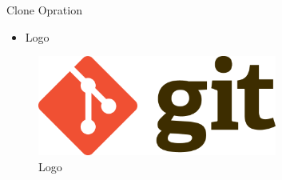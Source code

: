 
\sloppy
{\fontsize{18pt}{18pt}\selectfont Clone Opration \\} \par
\begin{itemize}
	\item Logo
\end{itemize}
\begin{figure}[ht]
	\centerline{\includegraphics[width=0.70\textwidth]{figures/logo}}
	\caption{Logo}
	\label{Logo}
\end{figure}
